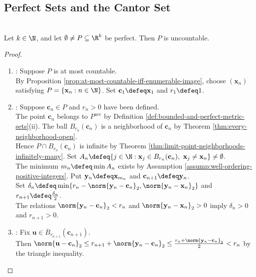 \subsection{Perfect Sets and the Cantor Set}

\begin{theorem} \label{thm:nonempty-perfect-subset-rk-uncountable} \\
Let $k\in\N$, and let $\emptyset\neq P\subseteq\R^k$ be perfect. Then $P$ is uncountable.
\begin{proof}
\begin{enumerate}[label=(\roman*)]
\setlength{\itemsep}{0pt}
\item {}: Suppose $P$ is at most countable.\\
By Proposition \ref{prop:at-most-countable-iff-enumerable-image}, choose $(\mathbf{x}_n)$ satisfying $P=\{\mathbf{x}_n:n\in\N\}$. Set $\mathbf{c}_1\defeq\mathbf{x}_1$ and $r_1\defeq1$.
\item {}: Suppose $\mathbf{c}_n\in P$ and $r_n>0$ have been defined.\\
The point $\mathbf{c}_n$ belongs to $P^{\operatorname{acc}}$ by Definition \ref{def:bounded-and-perfect-metric-sets}(ii). The ball $B_{r_n}(\mathbf{c}_n)$ is a neighborhood of $\mathbf{c}_n$ by Theorem \ref{thm:every-neighborhood-open}.\\
Hence $P\cap B_{r_n}(\mathbf{c}_n)$ is infinite by Theorem \ref{thm:limit-point-neighborhoods-infinitely-many}. Set $A_n\defeq\{j\in\N:\mathbf{x}_j\in B_{r_n}(\mathbf{c}_n),\ \mathbf{x}_j\neq\mathbf{x}_n\}\neq\emptyset$.\\
The minimum $m_n\defeq\min A_n$ exists by Assumption \ref{assump:well-ordering-positive-integers}. Put $\mathbf{y}_n\defeq\mathbf{x}_{m_n}$ and $\mathbf{c}_{n+1}\defeq\mathbf{y}_n$.\\
Set $\delta_n\defeq\min\{r_n-\norm{\mathbf{y}_n-\mathbf{c}_n}_2,\norm{\mathbf{y}_n-\mathbf{x}_n}_2\}$ and $r_{n+1}\defeq\frac{\delta_n}{2}$.\\
The relations $\norm{\mathbf{y}_n-\mathbf{c}_n}_2<r_n$ and $\norm{\mathbf{y}_n-\mathbf{x}_n}_2>0$ imply $\delta_n>0$ and $r_{n+1}>0$.
\item {}: Fix $\mathbf{u}\in\overline{B}_{r_{n+1}}(\mathbf{c}_{n+1})$.\\
Then $\norm{\mathbf{u}-\mathbf{c}_n}_2\leq r_{n+1}+\norm{\mathbf{y}_n-\mathbf{c}_n}_2\leq\frac{r_n+\norm{\mathbf{y}_n-\mathbf{c}_n}_2}{2}<r_n$ by the triangle inequality.\\

\end{enumerate}
\end{proof}
\end{theorem}
